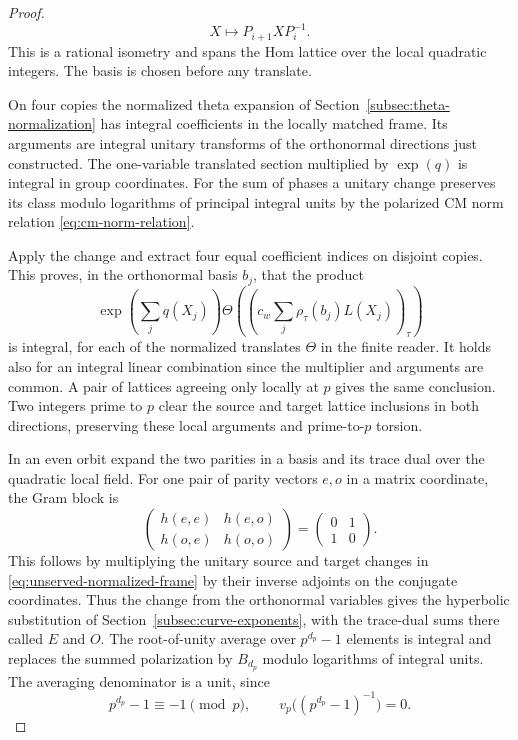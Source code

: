 \begin{proof}
\[
  X\mapsto P_{i+1} X P_i^{-1}.
\]
 This is a rational isometry
and spans the Hom lattice over the local quadratic integers.
The basis is chosen before any translate.


On four copies the normalized theta expansion of
Section~\ref{subsec:theta-normalization} has integral coefficients
in the locally matched frame. Its arguments are integral
unitary transforms of the orthonormal directions just
constructed. The one-variable translated section multiplied by
\(\exp(q)\) is integral in group coordinates. For the sum of
phases a unitary change preserves its class modulo logarithms
of principal integral units by the polarized CM norm relation
\eqref{eq:cm-norm-relation}.

Apply the change and extract four
equal coefficient indices on disjoint copies. This proves, in the
orthonormal basis \(b_j\), that the product
\[
  \exp\!\left(\sum_j q(X_j)\right)
  \Theta\!\left(\left(c_w\sum_j\rho_\tau(b_j)L(X_j)
                        \right)_\tau\right)
\]
is integral, for each of the normalized translates \(\Theta\)
in the finite reader. It holds also for an integral linear
combination since the multiplier and arguments are common. A pair
of lattices agreeing only locally at \(p\) gives the same conclusion.
Two integers prime to \(p\) clear the source and target lattice
inclusions in both directions, preserving these local arguments
and prime-to-\(p\) torsion.


In an even orbit expand the two parities in a basis and its
trace dual over the quadratic local field. For one pair of parity vectors \(e,o\) in a matrix coordinate, the Gram block is
\[
  \begin{pmatrix}h(e,e)&h(e,o)\\ h(o,e)&h(o,o)\end{pmatrix}=\begin{pmatrix}0&1\\1&0\end{pmatrix}.
\]
 This follows by multiplying the unitary
source and target changes in
\eqref{eq:unserved-normalized-frame} by their inverse adjoints
on the conjugate coordinates. Thus the change from the
orthonormal variables gives the hyperbolic substitution of
Section~\ref{subsec:curve-exponents}, with the trace-dual sums
there called \(E\) and \(O\). The root-of-unity average over
\(p^{d_p}-1\) elements is integral and replaces the summed
polarization by \(B_{d_p}\) modulo logarithms of integral
units.
The averaging denominator is a unit, since
\[
  p^{d_p}-1\equiv-1\pmod p,\qquad v_p\big((p^{d_p}-1)^{-1}\big)=0.
\]


\end{proof}
